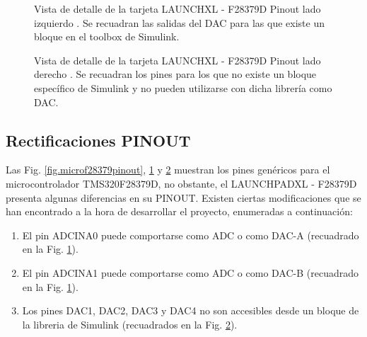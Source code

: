 \documentclass{report}
\begin{document}
\begin{figure}[!h]
    \begin{center}
        \end{center}
        \caption{Vista de detalle de la tarjeta LAUNCHXL - F28379D Pinout lado izquierdo \cite{catorce}. Se recuadran las salidas del DAC para las que existe un bloque en el toolbox de Simulink.}
        \label{fig.detalleizquierdomicrof28379pinout}
\end{figure}
\begin{figure}[!h]
    \begin{center}
        \end{center}
        \caption{Vista de detalle de la tarjeta LAUNCHXL - F28379D Pinout lado derecho \cite{catorce}. Se recuadran los pines para los que no existe un bloque específico de Simulink y no pueden utilizarse con dicha librería como DAC.}
        \label{fig.detallederechomicrof28379pinout}
\end{figure}

\clearpage
\subsection{Rectificaciones PINOUT} \label{sec.rectificacionespinout}

Las Fig. \ref{fig.microf28379pinout}, \ref{fig.detalleizquierdomicrof28379pinout} y \ref{fig.detallederechomicrof28379pinout} muestran los pines genéricos para el microcontrolador TMS320F28379D, no obstante, el LAUNCHPADXL - F28379D presenta algunas diferencias en su PINOUT. Existen ciertas modificaciones que se han encontrado a la hora de desarrollar el proyecto, enumeradas a continuación:

\begin{enumerate}
    \item El pin ADCINA0 puede comportarse como ADC o como DAC-A (recuadrado en la Fig. \ref{fig.detalleizquierdomicrof28379pinout}).
    \item El pin ADCINA1 puede comportarse como ADC o como DAC-B (recuadrado en la Fig. \ref{fig.detalleizquierdomicrof28379pinout}).
    \item Los pines DAC1, DAC2, DAC3 y DAC4  no son accesibles desde un bloque de la libreria de Simulink (recuadrados en la Fig. \ref{fig.detallederechomicrof28379pinout}). 
\end{enumerate}
\end{document}
